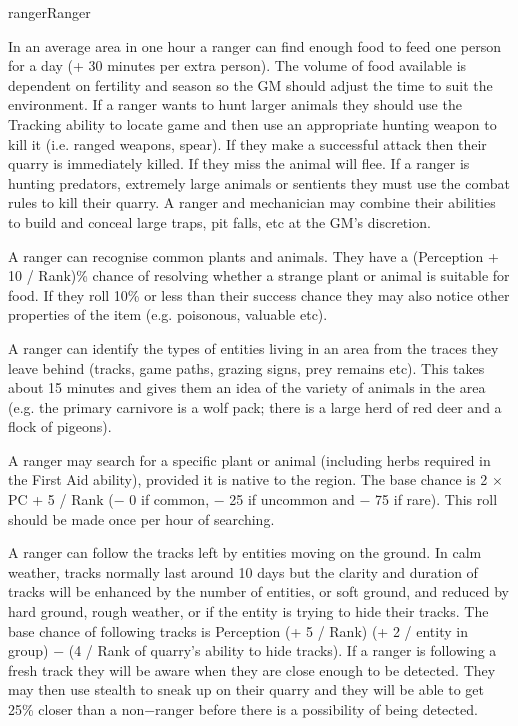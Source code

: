 \begin{Skill}[2.1]{ranger}{Ranger}
\begin{Description}
  In an average area in one hour a ranger can find enough food to feed
  one person for a day (+ 30 minutes per extra person).  The volume of
  food available is dependent on fertility and season so the GM should
  adjust the time to suit the environment.  If a ranger wants to hunt
  larger animals they should use the Tracking ability to locate game
  and then use an appropriate hunting weapon to kill it (i.e.  ranged
  weapons, spear).  If they make a successful attack then their quarry
  is immediately killed.  If they miss the animal will flee.  If a
  ranger is hunting predators, extremely large animals or sentients
  they must use the combat rules to kill their quarry.  A ranger and
  mechanician may combine their abilities to build and conceal large
  traps, pit falls, etc at the GM’s discretion.

\item[Identify and Find Plants and Animals] A ranger can recognise
  common plants and animals.  They have a (Perception + 10 / Rank)\%
  chance of resolving whether a strange plant or animal is suitable
  for food.  If they roll 10\% or less than their success chance they
  may also notice other properties of the item (e.g. poisonous,
  valuable etc).

  A ranger can identify the types of entities living in an area from
  the traces they leave behind (tracks, game paths, grazing signs,
  prey remains etc).  This takes about 15 minutes and gives them an
  idea of the variety of animals in the area (e.g. the primary
  carnivore is a wolf pack; there is a large herd of red deer and a
  flock of pigeons).

  A ranger may search for a specific plant or animal (including herbs
  required in the First Aid ability), provided it is native to the
  region.  The base chance is 2 × PC + 5 / Rank (− 0 if common, − 25
  if uncommon and − 75 if rare).  This roll should be made once per
  hour of searching.

\item[Tracking] A ranger can follow the tracks left by entities moving
  on the ground.  In calm weather, tracks normally last around 10 days
  but the clarity and duration of tracks will be enhanced by the
  number of entities, or soft ground, and reduced by hard ground,
  rough weather, or if the entity is trying to hide their tracks.  The
  base chance of following tracks is Perception (+ 5 / Rank) (+ 2 /
  entity in group) − (4 / Rank of quarry’s ability to hide tracks).
  If a ranger is following a fresh track they will be aware when they
  are close enough to be detected.  They may then use stealth to sneak
  up on their quarry and they will be able to get 25\% closer than a
  non−ranger before there is a possibility of being detected.


\end{Description}
\end{Skill}
